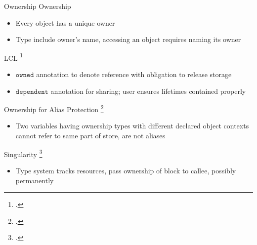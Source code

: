 \documentclass[aspectratio=169]{beamer}
\begin{document}
\begin{frame}{Ownership}
\footnotesize
Ownership
    \begin{itemize}
      \item Every object has a unique owner
      \item Type include owner's name, accessing an object requires naming its owner
    \end{itemize}
  LCL \footcite{evans_static_1996}
    \vspace{-0.1in}
    \begin{itemize}
        \item $\texttt{owned}$ annotation to denote reference with obligation to release storage
        \item $\texttt{dependent}$ annotation for sharing; user ensures lifetimes contained properly %
    \end{itemize}
  Ownership for Alias Protection \footcite{clarke_ownership_1998}
    \vspace{-0.1in}
    \begin{itemize}
      \item Two variables having ownership types with different declared object contexts cannot refer to same part of store, are not aliases
    \end{itemize}
  Singularity \footcite{fahndrich_language_2006}
    \vspace{-0.1in}
    \begin{itemize}
        \item Type system tracks resources, pass ownership of block to callee, possibly permanently
    \end{itemize}
  \vspace{0.1in}
\end{frame}
\end{document}
